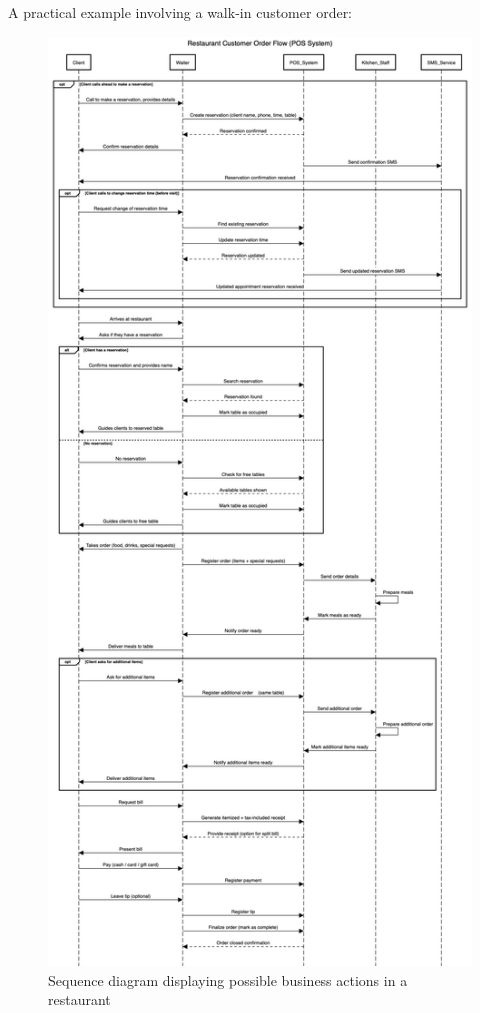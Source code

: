 \documentclass[11pt,a4paper,pdftex]{article}
\begin{document}
A practical example involving a walk-in customer order:

\begin{figure}[H]
    \centering
    \includegraphics[scale=0.22]{graphics/restaurant.png}
    \caption{Sequence diagram displaying possible business actions in a restaurant}
    \label{figures:sequence_restaurant}
\end{figure}
% 
\end{document}
